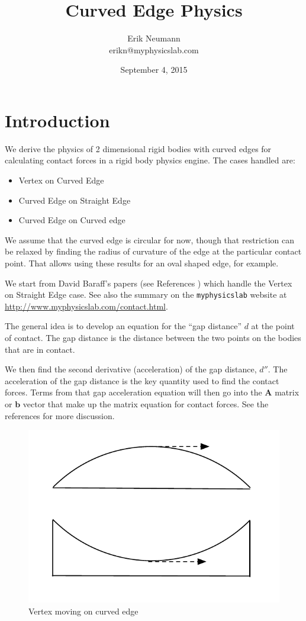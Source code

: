 \documentclass[final]{article}
\title{Curved Edge Physics}
\author{Erik Neumann\\
erikn@myphysicslab.com}
\date{September 4, 2015}
\begin{document}
\maketitle



\section{Introduction}

We derive the physics of 2 dimensional rigid bodies with curved edges for calculating
contact forces in a rigid body physics engine. The cases handled are:

\begin{itemize}
  \item Vertex on Curved Edge
  \item Curved Edge on Straight Edge
  \item Curved Edge on Curved edge
\end{itemize}

We assume that the curved edge is circular for now, though that restriction can be
relaxed by finding the radius of curvature of the edge at the particular contact point.
That allows using these results for an oval shaped edge, for example.

We start from David Baraff's papers (see References \cite{dB94, dB97}) which handle the
Vertex on Straight Edge case. See also the summary on the \texttt{myphysicslab} website
at \url{http://www.myphysicslab.com/contact.html}.

The general idea is to develop an equation for the ``gap distance'' $d$ at the point of
contact. The gap distance is the distance between the two points on the bodies that are
in contact.

We then find the second derivative (acceleration) of the gap distance, $d''$. The
acceleration of the gap distance is the key quantity used to find the contact forces.
Terms from that gap acceleration equation will then go into the $\mathbf{A}$ matrix or
$\mathbf{b}$ vector that make up the matrix equation for contact forces. See the
references for more discussion.

\begin{figure}[ht]
    \centering
    \includegraphics[width=0.45 \textwidth]{CEP_sliding_curved_edge.pdf}
    \caption{Vertex moving on curved edge}
    \label{fig:sliding_curved_edge}
\end{figure}
\end{document}
